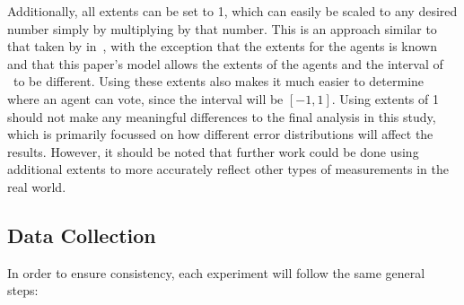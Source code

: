 Additionally, all extents can be set to 1, which can easily be scaled to any
desired number simply by multiplying by that number.
This is an approach similar to that taken by  in~\cite{Cohensius2017},
with the exception that the extents for the agents is known and that this paper's model
allows the extents of the agents and the interval of \systemspace\ to be different.
Using these extents also makes it much easier to determine where an agent
can vote, since the interval will be $[-1, 1]$.
Using extents of 1 should not make any meaningful differences to the final
analysis in this study, which is primarily focussed on how different error
distributions will affect the results.
However, it should be noted that further work could be done using additional extents
to more accurately reflect other types of measurements in the real world.

\subsection{Data Collection}\label{subsec:data-collection}
In order to ensure consistency, each experiment will follow the same general
steps:

